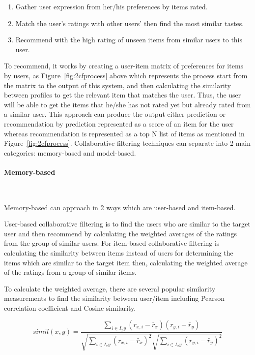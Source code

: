 \documentclass[12pt,oneside,openright,a4paper]{cpe-english-project}
\begin{document}
\begin{enumerate}
\item Gather user expression from her/his preferences by items rated.
\item Match the user’s ratings with other users’ then find the most similar tastes.
\item Recommend with the high rating of unseen items from similar users to this user.
\end{enumerate}

To recommend, it works by creating a user-item matrix of preferences for items by users, as Figure~\ref{fig:2cfprocess} above which represents the process start from the matrix to the output of this system, and then calculating the similarity between profiles to get the relevant item that matches the user. Thus, the user will be able to get the items that he/she has not rated yet but already rated from a similar user. This approach can produce the output either prediction or recommendation by prediction represented as a score of an item for the user whereas recommendation is represented as a top N list of items as mentioned in Figure~\ref{fig:2cfprocess}. Collaborative filtering techniques can separate into 2 main categories: memory-based and model-based.


\paragraph{Memory-based}\

Memory-based can approach in 2 ways which are user-based and item-based.

User-based collaborative filtering is to find the users who are similar to the target user and then recommend by calculating the weighted averages of the ratings from the group of similar users. For item-based collaborative filtering is calculating the similarity between items instead of users for determining the items which are similar to the target item then, calculating the weighted average of the ratings from a group of similar items.

To calculate the weighted average, there are several popular similarity measurements to find the similarity between user/item including Pearson correlation coefficient and Cosine similarity.

\begin{equation}\label{eq:simil}
simil(x, y) = \frac{\sum_{i\in I_xy}^{}(r_{x,i}-\bar{r}_{x})(r_{y,i}-\bar{r}_{y})}
{\sqrt{\sum_{i\in I_xy}^{}(r_{x,i}-\bar{r}_{x})^2}\sqrt{\sum_{i\in I_xy}^{}(r_{y,i}-\bar{r}_{y})^2}}
\end{equation}
\end{document}
